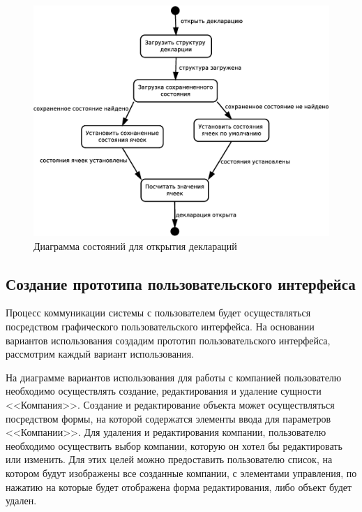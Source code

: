 \documentclass[14pt,a4paper]{reportmod}
\begin{document}
\begin{figure}
  \centering
  \includegraphics[scale=0.4]{uml/states_1}
  \caption{Диаграмма состояний для открытия деклараций}
  \label{pic:states_1}
\end{figure}

\subsection{Создание прототипа пользовательского интерфейса}

Процесс коммуникации системы с пользователем будет осуществляться посредством графического пользовательского интерфейса. На основании вариантов использования создадим прототип пользовательского интерфейса, рассмотрим каждый вариант использования.

На диаграмме вариантов использования для работы с компанией пользователю необходимо осуществлять создание, редактирования и удаление сущности <<Компания>>. Создание и редактирование объекта может осуществляться посредством формы, на которой содержатся элементы ввода для параметров <<Компании>>.
Для удаления и редактирования компании, пользователю необходимо осуществить выбор компании, которую он хотел бы редактировать или изменить. Для этих целей можно предоставить пользователю список, на котором будут изображены все созданные компании, с элементами управления, по нажатию на которые будет отображена форма редактирования, либо объект будет удален.
\end{document}
